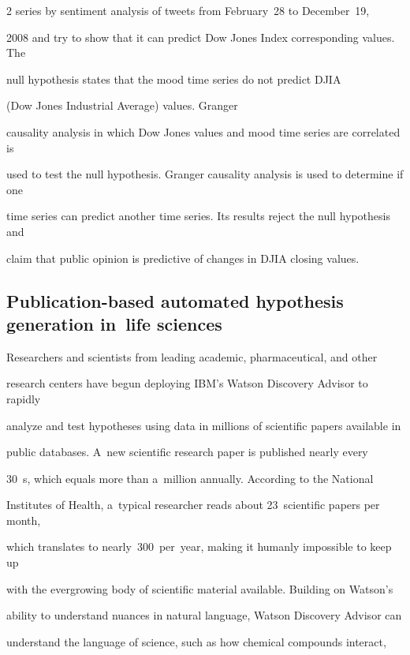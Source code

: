 \begin{multicols}{2}
series by sentiment analysis of tweets from February~28 to December~19,


2008 and try to show that it can predict Dow Jones Index corresponding values. The


null hypothesis states that the mood time series do not predict DJIA


(Dow Jones Industrial Average) values. Granger


causality analysis in which Dow Jones values and mood time series are correlated is


used to test the null hypothesis. Granger causality analysis is used to determine if one


time series can predict another time series. Its results reject the null hypothesis and


claim that public opinion is predictive of changes in DJIA closing values.





\subsection{Publication-based automated hypothesis generation in~life sciences}





  \noindent


  Researchers and scientists from leading academic, pharmaceutical, and other


research centers have begun deploying  IBM's  Watson Discovery Advisor to rapidly


analyze and test hypotheses using data in millions of scientific papers available in


public databases. A~new scientific research paper is published nearly every


30~s, which equals more than a~million annually. According to the National


Institutes of Health, a~typical researcher reads about 23~scientific papers per month,


which translates to nearly~300~per~year, making it humanly impossible to keep up


with the evergrowing body of scientific material available. Building on Watson's


ability to understand nuances in natural language, Watson Discovery Advisor can


understand the language of science, such as how chemical compounds interact,



\end{multicols}
